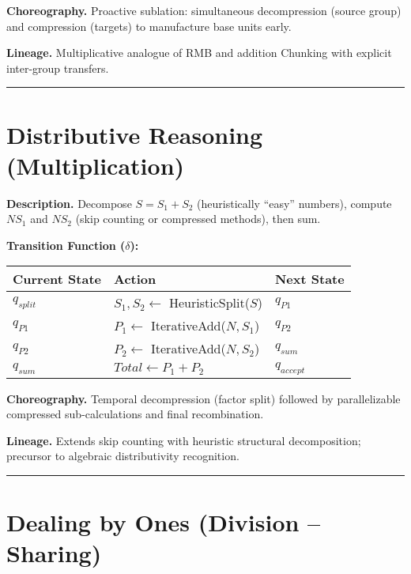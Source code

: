 \documentclass[
]{article}
\begin{document}
\textbf{Choreography.} Proactive sublation: simultaneous decompression
(source group) and compression (targets) to manufacture base units
early.

\textbf{Lineage.} Multiplicative analogue of RMB and addition Chunking
with explicit inter-group transfers.

\begin{center}\rule{0.5\linewidth}{0.5pt}\end{center}

\section{Distributive Reasoning
(Multiplication)}\label{distributive-reasoning-multiplication}

\textbf{Description.} Decompose \(S = S_1 + S_2\) (heuristically
``easy'' numbers), compute \(N S_1\) and \(N S_2\) (skip counting or
compressed methods), then sum.

\textbf{Transition Function (\(\delta\)):}

\begin{longtable}[]{@{}lll@{}}
\toprule\noalign{}
Current State & Action & Next State \\
\midrule\noalign{}
\endhead
\bottomrule\noalign{}
\endlastfoot
\(q_{split}\) & \(S_1, S_2 \leftarrow\) HeuristicSplit(\(S\)) &
\(q_{P1}\) \\
\(q_{P1}\) & \(P_1 \leftarrow\) IterativeAdd(\(N, S_1\)) & \(q_{P2}\) \\
\(q_{P2}\) & \(P_2 \leftarrow\) IterativeAdd(\(N, S_2\)) &
\(q_{sum}\) \\
\(q_{sum}\) & \(Total \leftarrow P_1 + P_2\) & \(q_{accept}\) \\
\end{longtable}

\textbf{Choreography.} Temporal decompression (factor split) followed by
parallelizable compressed sub-calculations and final recombination.

\textbf{Lineage.} Extends skip counting with heuristic structural
decomposition; precursor to algebraic distributivity recognition.

\begin{center}\rule{0.5\linewidth}{0.5pt}\end{center}

\section{Dealing by Ones (Division --
Sharing)}\label{dealing-by-ones-division-sharing}
\end{document}
